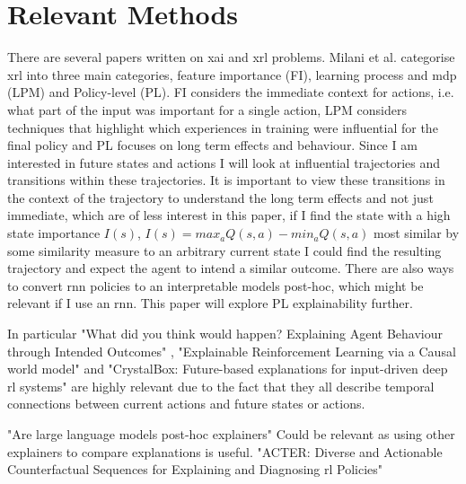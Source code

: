 \documentclass[UKenglish]{uiomasterthesis}
\begin{document}
\section{Relevant Methods}
There are several papers written on \ac{xai} and \ac{xrl} problems. Milani et al.\cite{milani2022survey} categorise \ac{xrl} into three main categories, feature importance (FI), learning process and \ac{mdp} (LPM) and Policy-level (PL). FI considers the immediate context for actions, i.e. what part of the input was important for a single action, LPM considers techniques that highlight which experiences in training were influential for the final policy and PL focuses on long term effects and behaviour. Since I am interested in future states and actions I will look at influential trajectories and transitions within these trajectories. It is important to view these transitions in the context of the trajectory to understand the long term effects and not just immediate, which are of less interest in this paper, if I find the state with a high state importance $I(s)$, $I(s) = max_aQ(s,a)-min_aQ(s,a)$ most similar by some similarity measure to an arbitrary current state I could find the resulting trajectory and expect the agent to intend a similar outcome. There are also ways to convert \ac{rnn} policies to an interpretable models post-hoc, which might be relevant if I use an \ac{rnn}. This paper will explore PL explainability further.

In particular "What did you think would happen? Explaining Agent Behaviour through Intended Outcomes" \cite{yau2020did}, "Explainable Reinforcement Learning via a Causal world model" \cite{yu2024explainable} and "CrystalBox: Future-based explanations for input-driven deep \ac{rl} systems" \cite{patel2024crystalbox} are highly relevant due to the fact that they all describe temporal connections between current actions and future states or actions.

"Are large language models post-hoc explainers" \cite{kroeger2024large} Could be relevant as using other explainers to compare explanations is useful. "ACTER: Diverse and Actionable Counterfactual Sequences for Explaining and Diagnosing \ac{rl} Policies" \cite{gajcin2024acter} 
\end{document}
